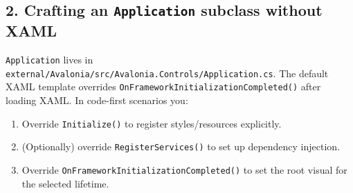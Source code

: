 \subsection{\texorpdfstring{2. Crafting an \texttt{Application} subclass
without
XAML}{2. Crafting an Application subclass without XAML}}\label{crafting-an-application-subclass-without-xaml}

\passthrough{\lstinline!Application!} lives in
\passthrough{\lstinline!external/Avalonia/src/Avalonia.Controls/Application.cs!}.
The default XAML template overrides
\passthrough{\lstinline!OnFrameworkInitializationCompleted()!} after
loading XAML. In code-first scenarios you:

\begin{enumerate}
\def\labelenumi{\arabic{enumi}.}
\tightlist
\item
  Override \passthrough{\lstinline!Initialize()!} to register
  styles/resources explicitly.
\item
  (Optionally) override \passthrough{\lstinline!RegisterServices()!} to
  set up dependency injection.
\item
  Override
  \passthrough{\lstinline!OnFrameworkInitializationCompleted()!} to set
  the root visual for the selected lifetime.
\end{enumerate}

